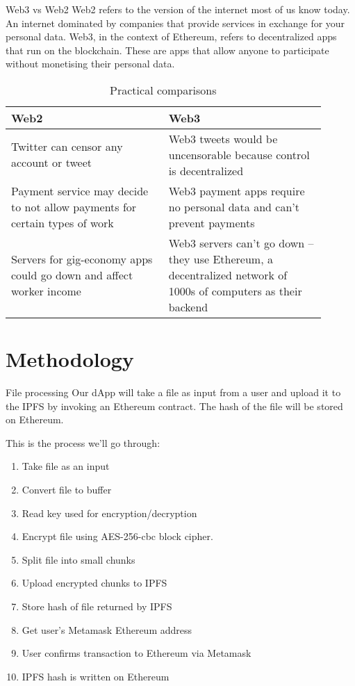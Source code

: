 \documentclass[aspectratio=169,usenames,dvipsnames,pdftex]{beamer}
\begin{document}
  \begin{frame}{Web3 vs Web2}
    Web2 refers to the version of the internet most of us know today. An internet dominated by companies that provide services in exchange for your personal data. Web3, in the context of Ethereum, refers to decentralized apps that run on the blockchain. These are apps that allow anyone to participate without monetising their personal data.

    \begin{table}
      \caption{Practical comparisons}
      \tiny
      \begin{tabular}{p{0.45\linewidth} p{0.45\linewidth}}
        \toprule
				Web2 & Web3 \\
				\midrule
        Twitter can censor any account or tweet & Web3 tweets would be uncensorable because control is decentralized \\
        Payment service may decide to not allow payments for certain types of work & Web3 payment apps require no personal data and can't prevent payments \\
        Servers for gig-economy apps could go down and affect worker income & Web3 servers can't go down – they use Ethereum, a decentralized network of 1000s of computers as their backend
      \end{tabular}
    \end{table}
  \end{frame}

  \section{Methodology}

  \begin{frame}{File processing}
    Our dApp will take a file as input from a user and upload it to the IPFS by invoking an Ethereum contract. The hash of the file will be stored on Ethereum.

    This is the process we’ll go through:
    \begin{multicols}{2}
      \begin{enumerate}[1.]
      \item Take file as an input
      \item Convert file to buffer
      \item Read key used for encryption/decryption
      \item Encrypt file using AES-256-cbc block cipher.
      \item Split file into small chunks
      \item Upload encrypted chunks to IPFS
      \item Store hash of file returned by IPFS
      \item Get user’s Metamask Ethereum address
      \item User confirms transaction to Ethereum via Metamask
      \item IPFS hash is written on Ethereum
      \end{enumerate}
    \end{multicols}
  \end{frame}
\end{document}
